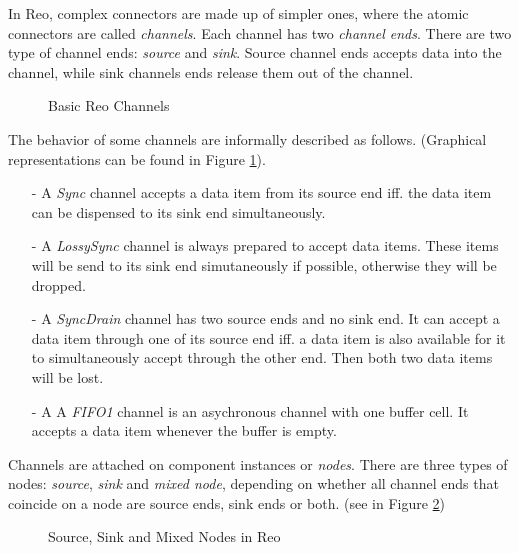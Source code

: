 \documentclass[conference, a4paper]{IEEEtran}
\begin{document}
In Reo, complex connectors are made up of simpler ones, where the atomic connectors are called
\emph{channels}. Each channel has two \emph{channel ends}. There are two type of channel ends:
\emph{source} and \emph{sink}. Source channel ends accepts data into the channel, while sink
channels ends release them out of the channel. 

\begin{figure}[h]
  \begin{center}
    
  \end{center}
  \caption{Basic Reo Channels}
  \label{fig:basic}
\end{figure}

The behavior of some channels are informally described as follows. (Graphical representations
can be found in Figure \ref{fig:basic}).

\begin{itemize}
  \item [-] A \emph{Sync} channel accepts a data item from its source end iff. the data item can be
    dispensed to its sink end simultaneously.
  \item [-] A \emph{LossySync} channel is always prepared to accept data items. These items will be
    send to its sink end simutaneously if possible, otherwise they will be dropped.
  \item [-] A \emph{SyncDrain} channel has two source ends and no sink end. It can accept a data
    item through one of its source end iff. a data item is also available for it to simultaneously
    accept through the other end. Then both two data items will be lost.
  \item [-] A A \emph{FIFO1} channel is an asychronous channel with one buffer cell. It accepts a
    data item whenever the buffer is empty.  
\end{itemize}

Channels are attached on component instances or \emph{nodes}. There are three types of nodes:
\emph{source}, \emph{sink} and \emph{mixed node}, depending on whether all channel ends that
coincide on a node are source ends, sink ends or both. (see in Figure \ref{fig:node})

\begin{figure}[h]
  \begin{center}
    
  \end{center}
  \caption{Source, Sink and Mixed Nodes in Reo}
  \label{fig:node}
\end{figure}
\end{document}
